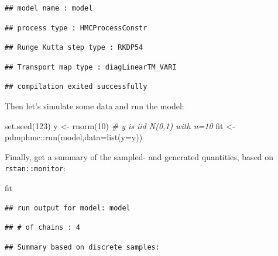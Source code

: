\documentclass[
]{book}
\newenvironment{Shaded}{\begin{snugshade}}{\end{snugshade}}
\newcommand{\AttributeTok}[1]{\textcolor[rgb]{0.77,0.63,0.00}{#1}}
\newcommand{\CommentTok}[1]{\textcolor[rgb]{0.56,0.35,0.01}{\textit{#1}}}
\newcommand{\DecValTok}[1]{\textcolor[rgb]{0.00,0.00,0.81}{#1}}
\newcommand{\FunctionTok}[1]{\textcolor[rgb]{0.00,0.00,0.00}{#1}}
\newcommand{\NormalTok}[1]{#1}
\newcommand{\OtherTok}[1]{\textcolor[rgb]{0.56,0.35,0.01}{#1}}
\newcommand{\SpecialCharTok}[1]{\textcolor[rgb]{0.00,0.00,0.00}{#1}}
\begin{document}
\begin{verbatim}
## model name : model
\end{verbatim}

\begin{verbatim}
## process type : HMCProcessConstr
\end{verbatim}

\begin{verbatim}
## Runge Kutta step type : RKDP54
\end{verbatim}

\begin{verbatim}
## Transport map type : diagLinearTM_VARI
\end{verbatim}

\begin{verbatim}
## compilation exited successfully
\end{verbatim}

Then let's simulate some data and run the model:

\begin{Shaded}
\begin{Highlighting}[]
\FunctionTok{set.seed}\NormalTok{(}\DecValTok{123}\NormalTok{)}
\NormalTok{y }\OtherTok{\textless{}{-}} \FunctionTok{rnorm}\NormalTok{(}\DecValTok{10}\NormalTok{) }\CommentTok{\# y is iid N(0,1) with n=10}
\NormalTok{fit }\OtherTok{\textless{}{-}}\NormalTok{ pdmphmc}\SpecialCharTok{::}\FunctionTok{run}\NormalTok{(model,}\AttributeTok{data=}\FunctionTok{list}\NormalTok{(}\AttributeTok{y=}\NormalTok{y))}
\end{Highlighting}
\end{Shaded}

Finally, get a summary of the sampled- and generated quantities, based on \texttt{rstan::monitor}:

\begin{Shaded}
\begin{Highlighting}[]
\NormalTok{fit}
\end{Highlighting}
\end{Shaded}

\begin{verbatim}
## run output for model: model
\end{verbatim}

\begin{verbatim}
## # of chains : 4
\end{verbatim}

\begin{verbatim}
## Summary based on discrete samples:
\end{verbatim}
\end{document}
